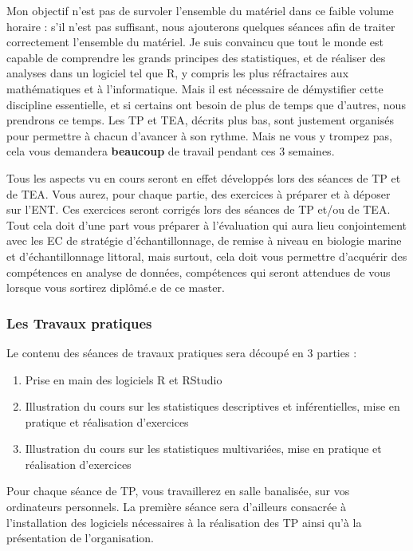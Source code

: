 \documentclass[
  a4paper,
]{article}
\providecommand{\tightlist}{%
  \setlength{\itemsep}{0pt}\setlength{\parskip}{0pt}}
\begin{document}
Mon objectif n'est pas de survoler l'ensemble du matériel dans ce faible volume horaire : s'il n'est pas suffisant, nous ajouterons quelques séances afin de traiter correctement l'ensemble du matériel. Je suis convaincu que tout le monde est capable de comprendre les grands principes des statistiques, et de réaliser des analyses dans un logiciel tel que R, y compris les plus réfractaires aux mathématiques et à l'informatique. Mais il est nécessaire de démystifier cette discipline essentielle, et si certains ont besoin de plus de temps que d'autres, nous prendrons ce temps. Les TP et TEA, décrits plus bas, sont justement organisés pour permettre à chacun d'avancer à son rythme. Mais ne vous y trompez pas, cela vous demandera \textbf{beaucoup} de travail pendant ces 3 semaines.

Tous les aspects vu en cours seront en effet développés lors des séances de TP et de TEA. Vous aurez, pour chaque partie, des exercices à préparer et à déposer sur l'ENT. Ces exercices seront corrigés lors des séances de TP et/ou de TEA. Tout cela doit d'une part vous préparer à l'évaluation qui aura lieu conjointement avec les EC de stratégie d'échantillonnage, de remise à niveau en biologie marine et d'échantillonnage littoral, mais surtout, cela doit vous permettre d'acquérir des compétences en analyse de données, compétences qui seront attendues de vous lorsque vous sortirez diplômé.e de ce master.

\hypertarget{les-travaux-pratiques}{%
\subsubsection{Les Travaux pratiques}\label{les-travaux-pratiques}}

Le contenu des séances de travaux pratiques sera découpé en 3 parties :

\begin{enumerate}
\def\labelenumi{\arabic{enumi}.}
\tightlist
\item
  Prise en main des logiciels R et RStudio
\item
  Illustration du cours sur les statistiques descriptives et inférentielles, mise en pratique et réalisation d'exercices
\item
  Illustration du cours sur les statistiques multivariées, mise en pratique et réalisation d'exercices
\end{enumerate}

Pour chaque séance de TP, vous travaillerez en salle banalisée, sur vos ordinateurs personnels. La première séance sera d'ailleurs consacrée à l'installation des logiciels nécessaires à la réalisation des TP ainsi qu'à la présentation de l'organisation.
\end{document}
